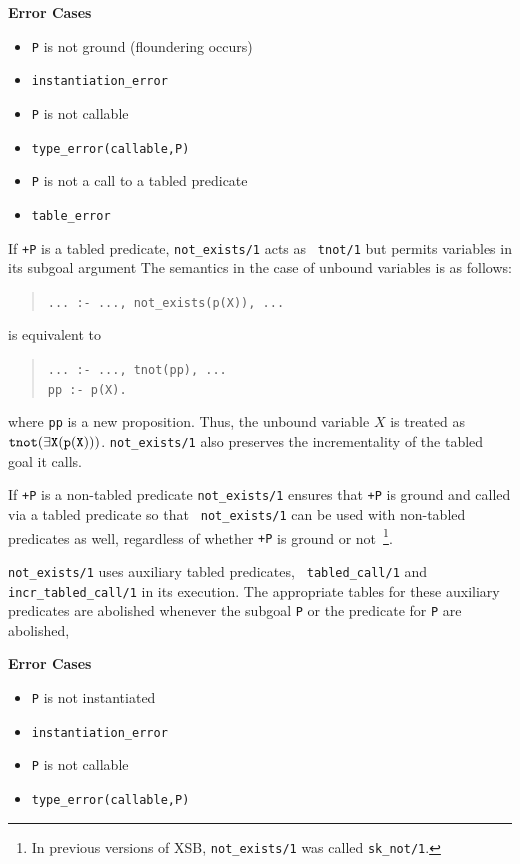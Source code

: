 \begin{description}
{\bf Error Cases}
\begin{itemize}
\item	{\tt P} is not ground (floundering occurs)
\bi
    \item {\tt instantiation\_error}
\ei
\item	{\tt P} is not callable
\bi
     \item {\tt type\_error(callable,P)}
\ei
\item {\tt P} is not a call to a tabled predicate
\bi
     \item{\tt table\_error}
\ei
\end{itemize}

If {\tt +P} is a tabled predicate, {\tt not\_exists/1} acts as {\tt
  tnot/1} but permits variables in its subgoal argument
The semantics in the case of unbound variables is as follows:
\begin{quote} 
\tt ... :- ...,~not\_exists(p(X)),~...  \end{quote} 
is equivalent to 
\begin{quote}
 \tt ... :- ..., tnot(pp),~...\\ pp :- p(X).
\end{quote} 
where {\tt pp} is a new proposition. Thus, the unbound variable $X$ is
treated as $\tt tnot(\exists X (p(X)))$.  {\tt not\_exists/1} also
preserves the incrementality of the tabled goal it calls.

If {\tt +P} is a non-tabled predicate {\tt not\_exists/1} ensures that
{\tt +P} is ground and called via a tabled predicate so that {\tt
  not\_exists/1} can be used with non-tabled predicates as well,
regardless of whether {\tt +P} is ground or not~\footnote{In previous
  versions of XSB, {\tt not\_exists/1} was called {\tt sk\_not/1}.}.

{\tt not\_exists/1} uses auxiliary tabled predicates, {\tt
  tabled\_call/1} and {\tt incr\_tabled\_call/1} in its execution.
The appropriate tables for these auxiliary predicates are abolished
whenever the subgoal {\tt P} or the predicate for {\tt P} are
abolished,

{\bf Error Cases}
\begin{itemize}
\item	{\tt P} is not instantiated
\bi
    \item {\tt instantiation\_error}
\ei
\item	{\tt P} is not callable
\bi
     \item {\tt type\_error(callable,P)}
\ei
\end{itemize}


\end{description}
